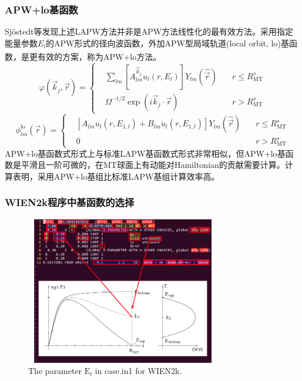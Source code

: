 \documentclass[cjk,slidestop,compress,mathserif,blue]{beamer}
\newcommand{\upcite}[1]{\hspace{0ex}\textsuperscript{\cite{#1}}} %
\begin{document}
\frame
{
\frametitle{\textrm{APW+lo}基函数}
\textrm{Sj\"ostedt}等发现上述\textrm{LAPW}方法并非是\textrm{APW}方法线性化的最有效方法。采用指定能量参数$E_l$的\textrm{APW}形式的径向波函数，外加\textrm{APW}型局域轨道(\textrm{local orbit, lo})基函数，是更有效的方案，称为\textrm{APW+lo}方法\upcite{SSC114-15_2000}。
$$  \varphi(\vec k_j,\vec r)=\left\{
  \begin{aligned}
    &\sum_{lm}[A^{\vec k_j}_{lm}u_l(r,E_l)]Y_{lm}(\hat{\vec r})\quad&r\leqslant R_{\mathrm{MT}}^s\\
    &\Omega^{-1/2}\exp(i\vec k_j\cdot\vec r) &r>R_{\mathrm{MT}}^s
  \end{aligned}\right.
  \label{eq:APW-basis}
$$
$$  \phi_{lm}^{\mathrm{lo}}(\vec r)=\left\{
  \begin{aligned}
  &[A_{lm}u_l(r,E_{1,l})+B_{lm}\dot u_l(r,E_{1,l})]Y_{lm}(\hat{\vec r})\quad&r\leqslant R_{\mathrm{MT}}^s\\
  &0&r>R_{\mathrm{MT}}^s
  \end{aligned}
\right.$$
\textrm{APW+lo}基函数式形式上与标准\textrm{LAPW}基函数式形式非常相似，但\textrm{APW+lo}基函数是平滑且一阶可微的，在\textrm{MT}球面上有动能对\textrm{Hamiltonian}的贡献需要计算。计算表明，采用\textrm{APW+lo}基组比标准\textrm{LAPW}基组计算效率高。
}

\frame
{
\frametitle{\textrm{WIEN2k}程序中基函数的选择}
\begin{figure}[h!]
	\vspace{-15pt}
\centering
\hspace{15pt}
\includegraphics[height=2.55in,width=3.35in,viewport=10 30 750 605,clip]{Figures/WIEN2k-in1.png}
\caption{\small \textrm{The parameter $\mathrm{E}_l$ in case.in1 for WIEN2k.}}%
\label{WIEN2k-in1}
\end{figure}
}
\end{document}
